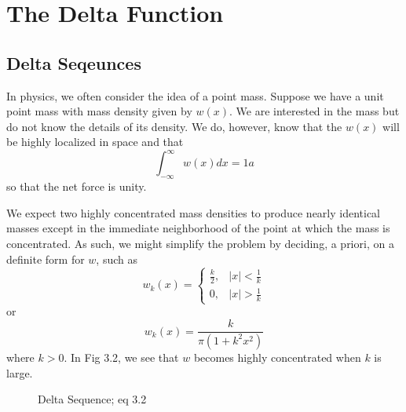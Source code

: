 \section{The Delta Function}
\subsection{Delta Seqeunces}
In physics, we often consider the idea of a point mass. Suppose we have a unit point mass with mass density given by \(w(x)\). We are interested in the mass but do not know the details of its density. We do, however, know that the \(w(x)\) will be highly localized in space and that 
\begin{equation}
    \int_{-\infty}^{\infty} w(x) dx = 1a
\end{equation}
so that the net force is unity.

We expect two highly concentrated mass densities to produce nearly identical masses except in the immediate neighborhood of the point at which the mass is concentrated. As such, we might simplify the problem by deciding, a priori, on a definite form for \(w\), such as
\begin{equation}
    w_k(x) = \begin{cases}
        \frac{k}{2}, & |x|<\frac{1}{k}\\
        0, & |x|>\frac{1}{k}
    \end{cases}
\end{equation}
or
\begin{equation}
    w_k(x)=\frac{k}{\pi (1+k^2x^2)}
\end{equation}
where \(k>0\). In Fig 3.2, we see that \(w\) becomes highly concentrated when \(k\) is large.

\begin{figure}
    \centering
    \caption{Delta Sequence; eq 3.2}
\end{figure}

